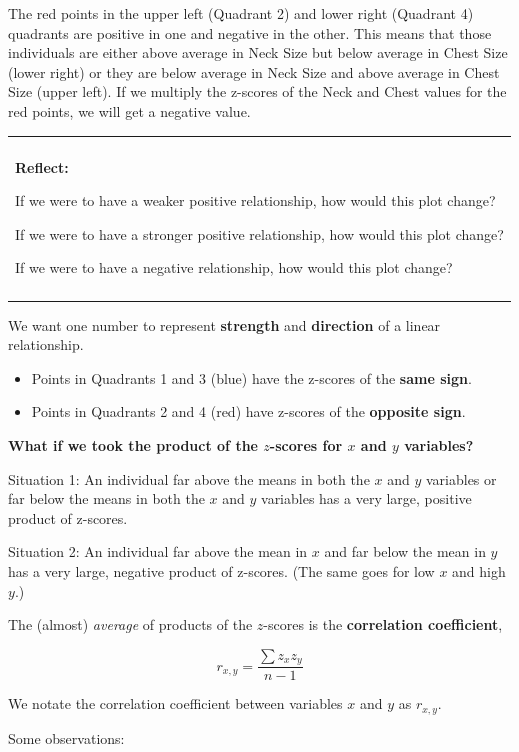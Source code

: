 \documentclass[]{book}
\providecommand{\tightlist}{%
  \setlength{\itemsep}{0pt}\setlength{\parskip}{0pt}}
\newenvironment{reflect}
{
    \begin{center}
    
    \begin{tabular}{|p{0.8\textwidth}|}
    \rowcolor{LightBlue}
    \hline\\
    \rowcolor{LightBlue}
    \textbf{Reflect:}
}
{
    \\\rowcolor{LightBlue}
    \\\hline
    \end{tabular} 
    \end{center}
}
\begin{document}
The red points in the upper left (Quadrant 2) and lower right (Quadrant 4) quadrants are positive in one and negative in the other. This means that those individuals are either above average in Neck Size but below average in Chest Size (lower right) or they are below average in Neck Size and above average in Chest Size (upper left). If we multiply the z-scores of the Neck and Chest values for the red points, we will get a negative value.

\begin{reflect}
If we were to have a weaker positive relationship, how would this plot
change?

If we were to have a stronger positive relationship, how would this plot
change?

If we were to have a negative relationship, how would this plot change?
\end{reflect}

We want one number to represent \textbf{strength} and \textbf{direction} of a linear relationship.

\begin{itemize}
\tightlist
\item
  Points in Quadrants 1 and 3 (blue) have the z-scores of the \textbf{same sign}.
\item
  Points in Quadrants 2 and 4 (red) have z-scores of the \textbf{opposite sign}.
\end{itemize}

\textbf{What if we took the product of the \(z\)-scores for \(x\) and \(y\) variables?}

Situation 1: An individual far above the means in both the \(x\) and \(y\) variables or far below the means in both the \(x\) and \(y\) variables has a very large, positive product of z-scores.

Situation 2: An individual far above the mean in \(x\) and far below the mean in \(y\) has a very large, negative product of z-scores. (The same goes for low \(x\) and high \(y\).)

The (almost) \emph{average} of products of the \(z\)-scores is the \textbf{correlation coefficient},

\[ r_{x,y} = \frac{\sum z_x z_y}{n-1} \]

We notate the correlation coefficient between variables \(x\) and \(y\) as \(r_{x,y}\).

Some observations:
\end{document}
